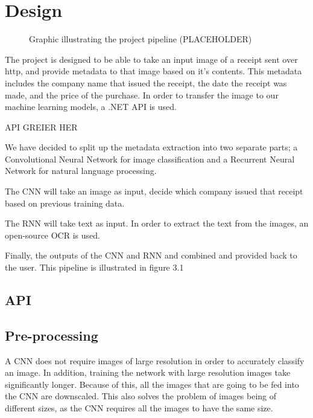 \chapter{Design}
\label{ch:design}

\begin{figure}[h]
    \caption{Graphic illustrating the project pipeline (PLACEHOLDER)}
    \label{fig:figure3}
\end{figure}
The project is designed to be able to take an input image of a receipt sent over http, and provide metadata to that image based on it's contents.
This metadata includes the company name that issued the receipt, the date the receipt was made, and the price of the purchase.
In order to transfer the image to our machine learning models, a .NET API is used.

API GREIER HER

We have decided to split up the metadata extraction into two separate parts;
a Convolutional Neural Network for image classification and a Recurrent Neural Network for natural language processing.

The CNN will take an image as input, decide which company issued that receipt based on previous training data.

The RNN will take text as input.
In order to extract the text from the images, an open-source OCR is used.

Finally, the outputs of the CNN and RNN and combined and provided back to the user.
This pipeline is illustrated in figure 3.1

\section{API}\label{sec:API}

\section{Pre-processing}\label{sec:pre-processing}
A CNN does not require images of large resolution in order to accurately classify an image.
In addition, training the network with large resolution images take significantly longer.
Because of this, all the images that are going to be fed into the CNN are downscaled.
This also solves the problem of images being of different sizes, as the CNN requires all the images to have the same size.

